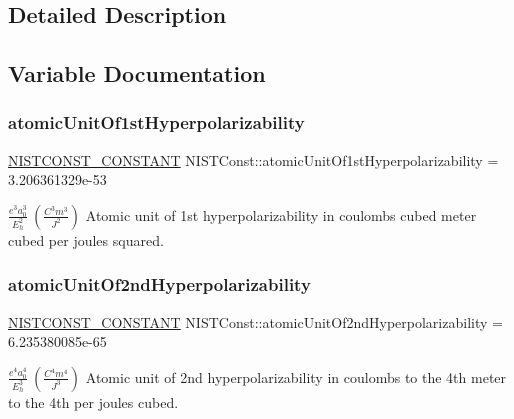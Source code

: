 \subsection{Detailed Description}


\subsection{Variable Documentation}
\mbox{\label{group___n_i_s_t_const-_atomic_unit_gaa8a2a7516740737167afdeb3cd4ee584}} 
\subsubsection{\texorpdfstring{atomic\+Unit\+Of1st\+Hyperpolarizability}{atomicUnitOf1stHyperpolarizability}}
{\footnotesize\ttfamily \mbox{\hyperlink{group___n_i_s_t_const-_macros_ga2b0fc1d7452373f816175dd86ce26729}{N\+I\+S\+T\+C\+O\+N\+S\+T\+\_\+\+C\+O\+N\+S\+T\+A\+NT}} N\+I\+S\+T\+Const\+::atomic\+Unit\+Of1st\+Hyperpolarizability = 3.\+206361329e-\/53}

$\frac{e^3 a_0^3}{E_h^2} \ (\frac{C^3 m^3}{J^2})$ Atomic unit of 1st hyperpolarizability in coulombs cubed meter cubed per joules squared. \mbox{\label{group___n_i_s_t_const-_atomic_unit_gabcc03469254baef16a69abd058ae5ada}} 
\subsubsection{\texorpdfstring{atomic\+Unit\+Of2nd\+Hyperpolarizability}{atomicUnitOf2ndHyperpolarizability}}
{\footnotesize\ttfamily \mbox{\hyperlink{group___n_i_s_t_const-_macros_ga2b0fc1d7452373f816175dd86ce26729}{N\+I\+S\+T\+C\+O\+N\+S\+T\+\_\+\+C\+O\+N\+S\+T\+A\+NT}} N\+I\+S\+T\+Const\+::atomic\+Unit\+Of2nd\+Hyperpolarizability = 6.\+235380085e-\/65}

$\frac{e^4 a_0^4}{E_h^3} \ (\frac{C^4 m^4}{J^3})$ Atomic unit of 2nd hyperpolarizability in coulombs to the 4th meter to the 4th per joules cubed. \mbox{\label{group___n_i_s_t_const-_atomic_unit_ga7f1326edcbb03c0df4c2e81afcea7ac8}} 
